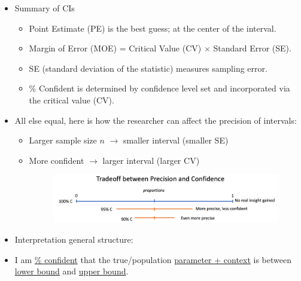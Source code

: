 \documentclass{article}
\begin{document}
\begin{itemize}
    \item Summary of CIs
    \begin{itemize}
        \item Point Estimate (PE) is the best guess; at the center of the interval.
        \item Margin of Error (MOE) = Critical Value (CV) $\times$ Standard Error (SE).
        \item[] SE (standard deviation of the statistic) measures sampling error.
        \item[] \% Confident is determined by confidence level set and incorporated via the critical value (CV).
    \end{itemize}
    \item All else equal, here is how the researcher can affect the precision of intervals:
    \begin{itemize}
        \item Larger sample size $n$ $\rightarrow$ smaller interval (smaller SE)
        \item More confident $\rightarrow$ larger interval (larger CV)
        \begin{figure}[H]
            \center\includegraphics[scale=0.5]{images/confidence-vs-precision.png}
        \end{figure}
    \end{itemize}
    \item Interpretation general structure:
    \item[] I am \ul{\% confident} that the true/population \ul{parameter + context} is between \\ \ul{lower bound} and \ul{upper bound}.
\end{itemize}\bigskip
\end{document}

